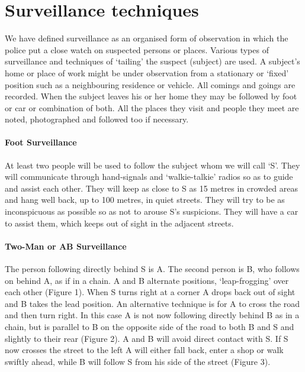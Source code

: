 \section{Surveillance techniques}

We have defined surveillance as an organised form of observation in
which the police put a close watch on suspected persons or places.
Various types of surveillance and techniques of `tailing' the suspect
(subject) are used. A subject's home or place of work might be under
observation from a stationary or `fixed' position such as a neighbouring
residence or vehicle. All comings and goings are recorded. When the
subject leaves his or her home they may be followed by foot or car or
combination of both. All the places they visit and people they meet are
noted, photographed and followed too if necessary.

\paragraph{Foot Surveillance}

At least two people will be used to follow the subject whom we will call
`S'. They will communicate through hand-signals and `walkie-talkie'
radios so as to guide and assist each other. They will keep as close to
S as 15 metres in crowded areas and hang well back, up to 100 metres, in
quiet streets. They will try to be as inconspicuous as possible so as
not to arouse S's suspicions. They will have a car to assist them, which
keeps out of sight in the adjacent streets.

\paragraph{Two-Man or AB Surveillance}

The person following directly behind S is A. The second person is B, who
follows on behind A, as if in a chain. A and B alternate positions,
`leap-frogging' over each other (Figure 1). When S turns right at a
corner A drops back out of sight and B takes the lead position. An
alternative technique is for A to cross the road and then turn right. In
this case A is not now following directly behind B as in a chain, but is
parallel to B on the opposite side of the road to both B and S and
slightly to their rear (Figure 2). A and B will avoid direct contact
with S. If S now crosses the street to the left A will either fall back,
enter a shop or walk swiftly ahead, while B will follow S from his side
of the street (Figure 3).

